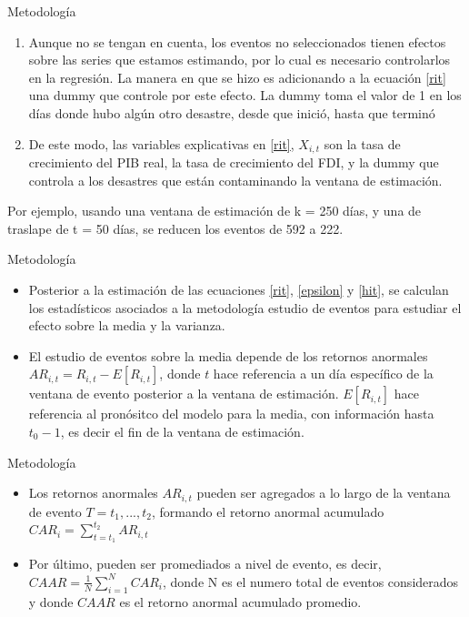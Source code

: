 \documentclass{beamer}
\newcounter{saveenumi}
\newcommand{\conti}{\setcounter{enumi}{\value{saveenumi}}}
\begin{document}
\begin{frame}{Metodología}
\begin{enumerate}
    \conti
    \item Aunque no se tengan en cuenta, los eventos no seleccionados tienen efectos sobre las series que estamos estimando, por lo cual es necesario controlarlos en la regresión. La manera en que se hizo es adicionando a la ecuación \eqref{rit} una dummy que controle por este efecto. La dummy toma el valor de 1 en los días donde hubo algún otro desastre, desde que inició, hasta que terminó
    \item De este modo, las variables explicativas en \eqref{rit}, $X_{i,t}$ son la tasa de crecimiento del PIB real, la tasa de crecimiento del FDI, y la dummy que controla a los desastres que están contaminando la ventana de estimación.
\end{enumerate}
Por ejemplo, usando una ventana de estimación de k = 250 días, y una de traslape de t = 50 días, se reducen los eventos de 592 a 222.
\end{frame}

\begin{frame}{Metodología}
\begin{itemize}
    \item Posterior a la estimación de las ecuaciones \eqref{rit}, \eqref{epsilon} y \eqref{hit}, se calculan los estadísticos asociados a la metodología estudio de eventos para estudiar el efecto sobre la media y la varianza.
    \item El estudio de eventos sobre la media depende de los retornos anormales $AR_{i,t} = R_{i,t} - E[R_{i,t}]$, donde $t$ hace referencia a un día específico de la ventana de evento posterior a la ventana de estimación. $E[R_{i,t}]$ hace referencia al pronósitco del modelo para la media, con información hasta $t_0 - 1$, es decir el fin de la ventana de estimación.    
\end{itemize}
\end{frame}

\begin{frame}{Metodología}
\begin{itemize}
\item Los retornos anormales $AR_{i,t}$ pueden ser agregados a lo largo de la ventana de evento $T = t_1,...,t_2$, formando el retorno anormal acumulado $CAR_{i} = \sum_{t=t_1}^{t_2} AR_{i,t}$
    \item Por último, pueden ser promediados a nivel de evento, es decir, $CAAR=\frac{1}{N}\sum_{i=1}^{N} CAR_i$, donde N es el numero total de eventos considerados y donde $CAAR$ es el retorno anormal acumulado promedio.
\end{itemize}
\end{frame}
\end{document}
